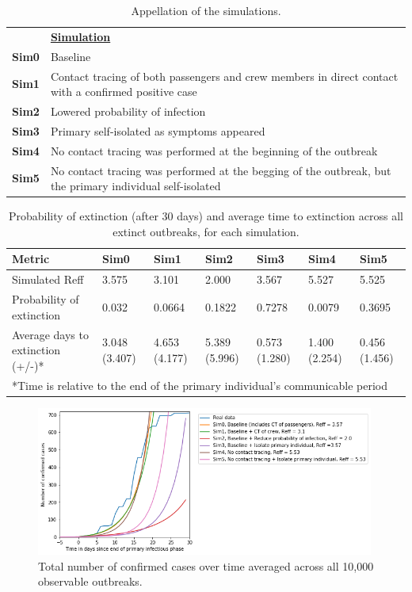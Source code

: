 \documentclass[sr]{drdc-report}
\begin{document}
\begin{table}
\centering
\caption{Appellation of the simulations.}\label{table_DPsimsNames}
\begin{tabular}{|p{1.5cm}p{10cm}|}
\hline
& \textbf{\underline{Simulation}}\\
 \textbf{Sim0} &Baseline\\
 \textbf{Sim1} &Contact tracing of both passengers and crew members in direct contact with a confirmed positive case\\
 \textbf{Sim2}  &Lowered probability of infection\\
 \textbf{Sim3}  &Primary self-isolated as symptoms appeared\\
 \textbf{Sim4}  &No contact tracing was performed at the beginning of the outbreak\\
 \textbf{Sim5}  &No contact tracing was performed at the begging of the outbreak, but the primary individual self-isolated\\
\hline
\end{tabular}
\end{table}

\begin{table}
\centering
\caption{Probability of extinction (after 30 days) and average time to extinction across all extinct outbreaks, for each simulation.}\label{table_DPextResults}
\begin{tabular}{p{4.7cm}|p{1.0cm}|p{1.2cm}p{1.2cm}p{1.2cm}p{1.2cm}p{1.2cm}}
\hline
\textbf{Metric} & \textbf{Sim0} & \textbf{Sim1} & \textbf{Sim2} & \textbf{Sim3} & \textbf{Sim4} & \textbf{Sim5} \\
\hline
Simulated Reff & 3.575 & 3.101 & 2.000 & 3.567 & 5.527 & 5.525\\
Probability of extinction & 0.032 & 0.0664 & 0.1822 & 0.7278 & 0.0079 & 0.3695\\
Average days to extinction (+/-)* & 3.048 (3.407) & 4.653 (4.177) & 5.389 (5.996) & 0.573 (1.280)  & 1.400 (2.254) & 0.456 (1.456)\\
\hline
\multicolumn{7}{p{11.7cm}}{*Time is relative to the end of the primary individual's communicable period}\\
\end{tabular}
\end{table}

\begin{figure}
  \includegraphics[width=0.99\textwidth, keepaspectratio=true]{figures/DP_posTest}
  \caption{Total number of confirmed cases over time averaged across all 10,000 observable outbreaks.}\label{fig_DP_posTest}
\end{figure}
\end{document}
